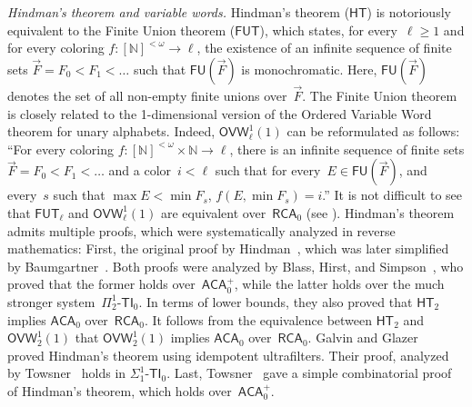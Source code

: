 \documentclass{article}
\numberwithin{theorem}{section}
\newcommand{\RCA}{\mathsf{RCA}}
\newcommand{\ACA}{\mathsf{ACA}}
\newcommand{\OVW}{\mathsf{OVW}}
\newcommand{\FUT}{\mathsf{FUT}} %
\newcommand{\HT}{\mathsf{HT}} %
\newcommand{\NN}{\mathbb{N}}
\newcommand{\FU}{\mathsf{FU}} %
\def\qt#1{``#1''}%
\begin{document}
\textit{Hindman's theorem and variable words.} Hindman's theorem ($\HT$) is notoriously equivalent to the Finite Union theorem ($\FUT$), which states, for every~$\ell \geq 1$ and for every coloring $f : [\NN]^{<\omega} \to \ell$, the existence of an infinite sequence of finite sets $\vec{F} = F_0 < F_1 < \dots$ such that $\FU(\vec{F})$ is monochromatic. Here, $\FU(\vec{F})$ denotes the set of all non-empty finite unions over~$\vec{F}$. The Finite Union theorem is closely related to the 1-dimensional version of the Ordered Variable Word theorem for unary alphabets. Indeed, $\OVW^1_\ell(1)$ can be reformulated as follows: \qt{For every coloring $f : [\NN]^{<\omega} \times \NN \to \ell$, there is an infinite sequence of finite sets $\vec{F} = F_0 < F_1 < \dots$ and a color~$i < \ell$ such that for every~$E \in \FU(\vec{F})$, and every~$s$ such that $\max E < \min F_s$, $f(E, \min F_s) = i$.} It is not difficult to see that $\FUT_\ell$ and $\OVW^1_\ell(1)$ are equivalent over~$\RCA_0$ (see ). Hindman's theorem admits multiple proofs, which were systematically analyzed in reverse mathematics: First, the original proof by Hindman~\cite{Hindman1974Finite}, which was later simplified by Baumgartner~\cite{baumgartnerShortProofHindmans1974}. Both proofs were analyzed by Blass, Hirst, and Simpson~\cite{blass1987logical}, who proved that the former holds over~$\ACA_0^+$, while the latter holds over the much stronger system~$\Pi^1_2\mbox{-}\mathsf{TI}_0$. In terms of lower bounds, they also proved that $\HT_2$ implies $\ACA_0$ over~$\RCA_0$. It follows from the equivalence between $\HT_2$ and $\OVW^1_2(1)$ that $\OVW^1_2(1)$ implies $\ACA_0$ over~$\RCA_0$. Galvin and Glazer~\cite{hindmanAlgebraStoneCechCompactification2012} proved Hindman's theorem using idempotent ultrafilters. Their proof, analyzed by Towsner~\cite{towsner2011hindman} holds in $\Sigma^1_1\mbox{-}\mathsf{TI}_0$. Last, Towsner~\cite{Towsner2012simple} gave a simple combinatorial proof of Hindman's theorem, which holds over~$\ACA_0^+$.
\end{document}
